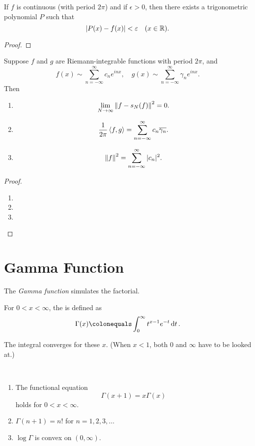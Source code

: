 \begin{theorem}
If $f$ is continuous (with period $2\pi$) and if $\epsilon>0$, then there exists a trigonometric polynomial $P$ such that
\[\left|P(x)-f(x)\right|<\varepsilon\quad(x\in\mathbb R).\]
\end{theorem}

\begin{proof}

\end{proof}

\begin{theorem}
Suppose $f$ and $g$ are Riemann-integrable functions with period $2\pi$, and 
\[f(x)\sim\sum_{n=-\infty}^{\infty}c_ne^{inx},\quad g(x)\sim\sum_{n=-\infty}^{\infty}\gamma_ne^{inx}.\]
Then
\begin{enumerate}[label=(\roman*)]
\item \[\lim_{N\to\infty}\norm{f-s_N(f)}^2=0.\]
\item \[\frac{1}{2\pi}\left\langle f,g\right\rangle=\sum_{n=-\infty}^{\infty}c_n\overline{\gamma_n}.\]
\item \[\norm{f}^2=\sum_{n=-\infty}^{\infty}|c_n|^2.\]
\end{enumerate}
\end{theorem}

\begin{proof} \
\begin{enumerate}[label=(\roman*)]
\item 
\item 
\item 
\end{enumerate}
\end{proof}
\pagebreak

\section{Gamma Function}
The \emph{Gamma function} simulates the factorial.

\begin{definition}
For $0<x<\infty$, the  is defined as
\begin{equation}
\Gamma(x)\colonequals\int_0^\infty t^{x-1}e^{-t}\dd{t}.
\end{equation}
\end{definition}

The integral converges for these $x$. (When $x<1$, both $0$ and $\infty$ have to be looked at.)

\begin{lemma} \
\begin{enumerate}[label=(\roman*)]
\item The functional equation
\[\Gamma(x+1)=x\Gamma(x)\]
holds for $0<x<\infty$.
\item $\Gamma(n+1)=n!$ for $n=1,2,3,\dots$
\item $\log\Gamma$ is convex on $(0,\infty)$.
\end{enumerate}
\end{lemma}

